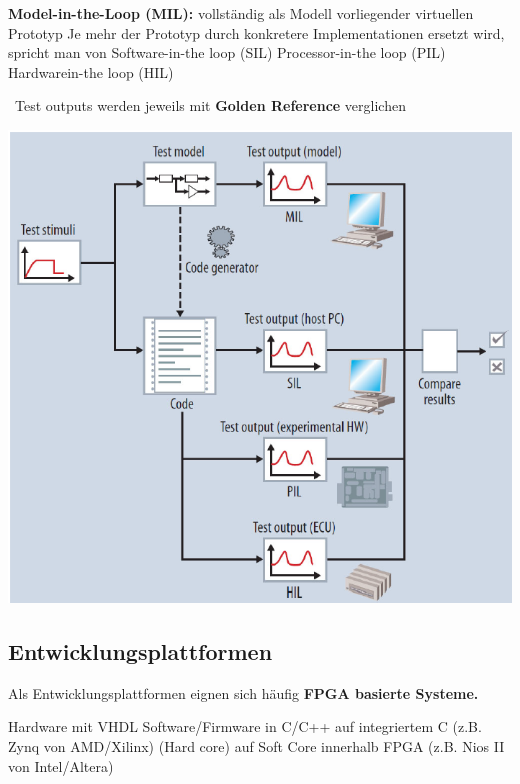 \begin{outline}
    \1 \textbf{Model-in-the-Loop (MIL):} vollständig als Modell vorliegender virtuellen Prototyp
    \1 Je mehr der Prototyp durch konkretere Implementationen ersetzt wird, spricht man von
        \2 Software-in-the loop (SIL)
        \2 Processor-in-the loop (PIL)
        \2 Hardwarein-the loop (HIL)
\end{outline}

\vspace{0.2cm}

\textrightarrow\ Test outputs werden jeweils mit \textbf{Golden Reference} verglichen
\begin{center}
    \includegraphics[width=0.9\columnwidth]{images/x_in_loop_testing.png}
\end{center}


\subsection{Entwicklungsplattformen}

Als Entwicklungsplattformen eignen sich häufig \textbf{FPGA basierte Systeme.}

\begin{outline}
    \1 Hardware mit VHDL
    \1 Software/Firmware in C/C++
        \2 auf integriertem \micro C (z.B. Zynq von AMD/Xilinx) (Hard core)
        \2 auf Soft Core innerhalb FPGA (z.B. Nios II von Intel/Altera)
\end{outline}

